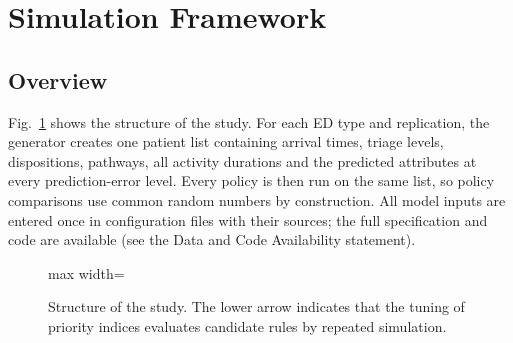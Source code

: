 \section{Simulation Framework}
\label{sec:framework}

\subsection{Overview}

Fig.~\ref{fig:framework} shows the structure of the study. For each ED type and replication, the generator creates one patient list containing arrival times, triage levels, dispositions, pathways, all activity durations and the predicted attributes at every prediction-error level. Every policy is then run on the same list, so policy comparisons use common random numbers by construction. All model inputs are entered once in configuration files with their sources; the full specification and code are available (see the Data and Code Availability statement).

\begin{figure}[!htbp]
\centering
\begin{adjustbox}{max width=\textwidth}
\end{adjustbox}
\caption{Structure of the study. The lower arrow indicates that the tuning of priority indices evaluates candidate rules by repeated simulation.}
\label{fig:framework}
\end{figure}

